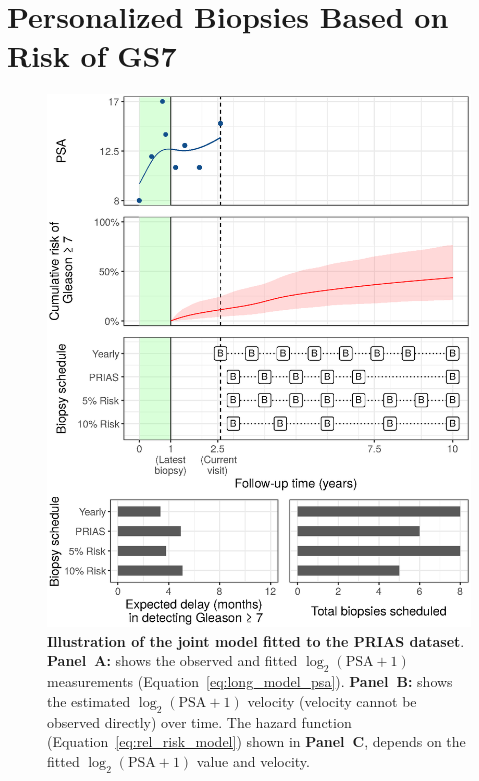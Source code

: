 \section{Personalized Biopsies Based on Risk of GS7}
\begin{figure}
\centerline{\includegraphics[width=\columnwidth]{images/demo_pat1.eps}}
\caption{\textbf{Illustration of the joint model fitted to the PRIAS dataset}. \textbf{Panel~A:} shows the observed and fitted $\log_2(\mbox{PSA} + 1)$ measurements (Equation~\ref{eq:long_model_psa}). \textbf{Panel~B:} shows the estimated $\log_2(\mbox{PSA} + 1)$ velocity (velocity cannot be observed directly) over time. The hazard function (Equation~\ref{eq:rel_risk_model}) shown in \textbf{Panel~C}, depends on the fitted $\log_2(\mbox{PSA} + 1)$ value and velocity.}
\label{fig:dynRiskPlot_2340}
\end{figure}